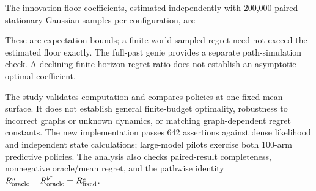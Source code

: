 The innovation-floor coefficients, estimated independently with 200,000 paired stationary Gaussian samples per configuration, are

These are expectation bounds; a finite-world sampled regret need not exceed the estimated floor exactly. The full-past genie provides a separate path-simulation check. A declining finite-horizon regret ratio does not establish an asymptotic optimal coefficient.



The study validates computation and compares policies at one fixed mean surface. It does not establish general finite-budget optimality, robustness to incorrect graphs or unknown dynamics, or matching graph-dependent regret constants. The new implementation passes 642 assertions against dense likelihood and independent state calculations; large-model pilots exercise both 100-arm predictive policies. The analysis also checks paired-result completeness, nonnegative oracle/mean regret, and the pathwise identity $R_{\rm oracle}^{\pi}-R_{\rm oracle}^{b^*}=R_{\rm fixed}^{\pi}$.
